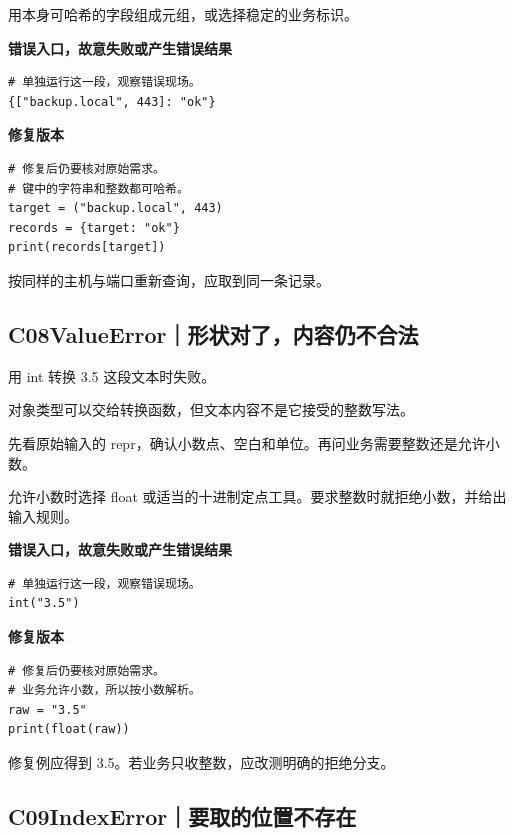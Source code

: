 \documentclass[UTF8,a4paper,oneside,openany,fontset=none,11pt]{ctexbook}
\newcommand{\code}[1]{\texttt{\detokenize{#1}}}
\newcommand{\CaseStep}[2]{\par\smallskip{\bfseries\color{Muted}#1}\enspace #2\par}
\begin{document}
\CaseStep{修复}{用本身可哈希的字段组成元组，或选择稳定的业务标识。}

\textbf{错误入口，故意失败或产生错误结果}

\begin{lstlisting}[style=errorcode,title={错误复现（故意失败或错误结果）：\code{case_07_bad.py.txt}}]
# 单独运行这一段，观察错误现场。
{["backup.local", 443]: "ok"}
\end{lstlisting}

\textbf{修复版本}

\begin{lstlisting}[title={\code{case_07.py}}]
# 修复后仍要核对原始需求。
# 键中的字符串和整数都可哈希。
target = ("backup.local", 443)
records = {target: "ok"}
print(records[target])
\end{lstlisting}

\CaseStep{复验}{按同样的主机与端口重新查询，应取到同一条记录。}

\subsection*{C08\enspace ValueError｜形状对了，内容仍不合法}

\CaseStep{现象}{用 int 转换 3.5 这段文本时失败。}

\CaseStep{原因}{对象类型可以交给转换函数，但文本内容不是它接受的整数写法。}

\CaseStep{排查}{先看原始输入的 repr，确认小数点、空白和单位。再问业务需要整数还是允许小数。}

\CaseStep{修复}{允许小数时选择 float 或适当的十进制定点工具。要求整数时就拒绝小数，并给出输入规则。}

\textbf{错误入口，故意失败或产生错误结果}

\begin{lstlisting}[style=errorcode,title={错误复现（故意失败或错误结果）：\code{case_08_bad.py.txt}}]
# 单独运行这一段，观察错误现场。
int("3.5")
\end{lstlisting}

\textbf{修复版本}

\begin{lstlisting}[title={\code{case_08.py}}]
# 修复后仍要核对原始需求。
# 业务允许小数，所以按小数解析。
raw = "3.5"
print(float(raw))
\end{lstlisting}

\CaseStep{复验}{修复例应得到 3.5。若业务只收整数，应改测明确的拒绝分支。}

\subsection*{C09\enspace IndexError｜要取的位置不存在}
\end{document}
